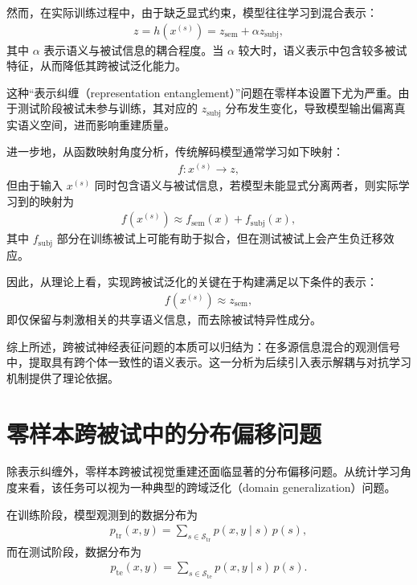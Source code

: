 然而，在实际训练过程中，由于缺乏显式约束，模型往往学习到混合表示：
\begin{align}
  z = h(x^{(s)}) = z_{\mathrm{sem}} + \alpha z_{\mathrm{subj}},
\end{align}
其中 $\alpha$ 表示语义与被试信息的耦合程度。当 $\alpha$ 较大时，语义表示中包含较多被试特征，从而降低其跨被试泛化能力。

这种“表示纠缠（representation entanglement）”问题在零样本设置下尤为严重。由于测试阶段被试未参与训练，其对应的 $z_{\mathrm{subj}}$ 分布发生变化，导致模型输出偏离真实语义空间，进而影响重建质量。

进一步地，从函数映射角度分析，传统解码模型通常学习如下映射：
\begin{align}
  f: x^{(s)} \rightarrow z,
\end{align}
但由于输入 $x^{(s)}$ 同时包含语义与被试信息，若模型未能显式分离两者，则实际学习到的映射为
\begin{align}
  f(x^{(s)}) \approx f_{\mathrm{sem}}(x) + f_{\mathrm{subj}}(x),
\end{align}
其中 $f_{\mathrm{subj}}$ 部分在训练被试上可能有助于拟合，但在测试被试上会产生负迁移效应。

因此，从理论上看，实现跨被试泛化的关键在于构建满足以下条件的表示：
\begin{align}
  f(x^{(s)}) \approx z_{\mathrm{sem}},
\end{align}
即仅保留与刺激相关的共享语义信息，而去除被试特异性成分。

综上所述，跨被试神经表征问题的本质可以归结为：在多源信息混合的观测信号中，提取具有跨个体一致性的语义表示。这一分析为后续引入表示解耦与对抗学习机制提供了理论依据。

\section{零样本跨被试中的分布偏移问题}

除表示纠缠外，零样本跨被试视觉重建还面临显著的分布偏移问题。从统计学习角度来看，该任务可以视为一种典型的跨域泛化（domain generalization）问题。

在训练阶段，模型观测到的数据分布为
\begin{align}
  p_{\mathrm{tr}}(x,y) = \sum_{s \in \mathcal{S}_{\mathrm{tr}}} p(x,y \mid s) \, p(s),
\end{align}
而在测试阶段，数据分布为
\begin{align}
  p_{\mathrm{te}}(x,y) = \sum_{s \in \mathcal{S}_{\mathrm{te}}} p(x,y \mid s) \, p(s).
\end{align}

